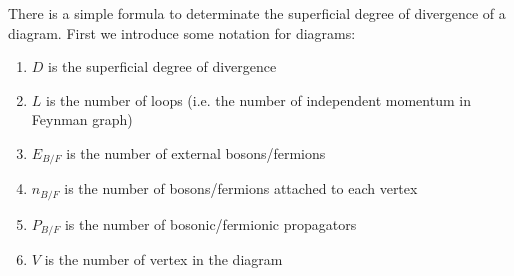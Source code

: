 \documentclass[TheoreticalPhy_ModB.tex]{subfiles}
\begin{document}
\begin{exercise}
{\begin{comment}
\vertex[left=of e4](e8);
\diagram*{
	(e1) -- [photon] (e5),
	(e2) -- [photon] (e6),
	(e3) -- [photon] (e7),
	(e4) -- [photon] (e8),
	(e1) -- (e2) -- (e3) -- (e4) -- (e1),
};
\end{feynman}
\end{tikzpicture}
\]
Verify that following diagrams are not superficially divergent ($D<0$):
\[
\begin{tikzpicture}[baseline=(e0)]
\begin{feynman}[small]
\vertex(e0);
\vertex[above=0.5cm of e0](e1);
\vertex[right=of e1](e2);
\vertex[below=of e2](e3);
\vertex[left=of e3](e4);
\vertex[left=of e1](e5);
\vertex[right=of e2](e6);
\vertex[right=of e3](e7);
\vertex[left=of e4](e8);
\diagram*{
	(e5) --  (e6),
	(e7) --  (e8),
	(e1) -- [photon] (e4),
	(e2) -- [photon] (e3),
};
\end{feynman}
\end{tikzpicture}
\qquad
\begin{tikzpicture}[baseline=(e0)]
\begin{feynman}[small]
\vertex(e0);
\vertex[above=0.5cm of e0](e1);
\vertex[right=of e1](e2);
\vertex[below=of e2](e3);
\vertex[left=of e3](e4);
\vertex[left=of e1](e5);
\vertex[right=of e2](e6);
\vertex[right=of e3](e7);
\vertex[left=of e4](e8);
\diagram*{
	(e1) -- [photon] (e2),
	(e3) -- [photon] (e4),
	(e5) -- (e1) -- (e4) -- (e8),
	(e6) -- (e2) -- (e3) -- (e7),
};
\end{feynman}
\end{tikzpicture}
\]
\onlyinsubfile{\end{comment}}
\end{exercise}

There is a simple formula to determinate the superficial degree of divergence of a diagram. First we introduce some notation for diagrams:
\begin{enumerate}
\item $D$ is the superficial degree of divergence
\item $L$ is the number of loops (i.e. the number of independent momentum in Feynman graph)
\item $E_{B/F}$ is the number of external bosons/fermions
\item $n_{B/F}$ is the number of bosons/fermions attached to each vertex
\item $P_{B/F}$ is the number of bosonic/fermionic propagators
\item $V$ is the number of vertex in the diagram
\end {enumerate}
\end{document}
